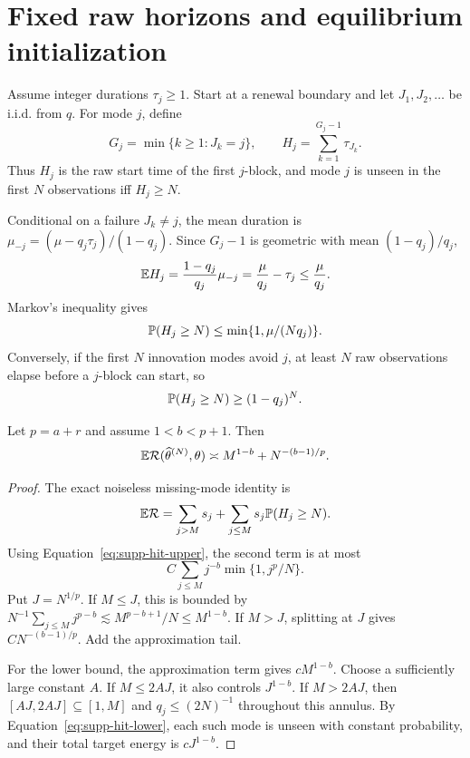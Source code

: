 \section{Fixed raw horizons and equilibrium initialization}

Assume integer durations $\tau_j\ge1$. Start at a renewal boundary and let
$J_1,J_2,\ldots$ be i.i.d. from $q$. For mode $j$, define
\[
G_j=\min\{k\ge1:J_k=j\},\qquad
H_j=\sum_{k=1}^{G_j-1}\tau_{J_k}.
\]
Thus $H_j$ is the raw start time of the first $j$-block, and mode $j$ is unseen
in the first $N$ observations iff $H_j\ge N$.

Conditional on a failure $J_k\ne j$, the mean duration is
$\mu_{-j}=(\mu-q_j\tau_j)/(1-q_j)$. Since $G_j-1$ is geometric with mean
$(1-q_j)/q_j$,
\[
\mathbb{E} H_j=\frac{1-q_j}{q_j}\mu_{-j}
=\frac{\mu}{q_j}-\tau_j\le\frac{\mu}{q_j}.
\]
Markov's inequality gives
\begin{equation}
\mathbb{P}(H_j\ge N)\le\min\{1,\mu/(Nq_j)\}.
\label{eq:supp-hit-upper}
\end{equation}
Conversely, if the first $N$ innovation modes avoid $j$, at least $N$ raw
observations elapse before a $j$-block can start, so
\begin{equation}
\mathbb{P}(H_j\ge N)\ge(1-q_j)^N.
\label{eq:supp-hit-lower}
\end{equation}

\begin{theorem}
Let $p=a+r$ and assume $1<b<p+1$. Then
\[
\mathbb{E}\mathcal{R}(\widehat\theta^{(N)},\theta)
\mathrel{\asymp} M^{1-b}+N^{-(b-1)/p}.
\]
\end{theorem}

\begin{proof}
The exact noiseless missing-mode identity is
\[
\mathbb{E}\mathcal{R}=\sum_{j>M}s_j+\sum_{j\le M}s_j\mathbb{P}(H_j\ge N).
\]
Using Equation~\eqref{eq:supp-hit-upper}, the second term is at most
\[
C\sum_{j\le M}j^{-b}\min\{1,j^p/N\}.
\]
Put $J=N^{1/p}$. If $M\le J$, this is bounded by
$N^{-1}\sum_{j\le M}j^{p-b}\lesssim M^{p-b+1}/N\le M^{1-b}$.
If $M>J$, splitting at $J$ gives $CN^{-(b-1)/p}$. Add the approximation tail.

For the lower bound, the approximation term gives $cM^{1-b}$. Choose a
sufficiently large constant $A$. If $M\le2AJ$, it also controls $J^{1-b}$.
If $M>2AJ$, then $[AJ,2AJ]\subseteq[1,M]$ and
$q_j\le(2N)^{-1}$ throughout this annulus. By
Equation~\eqref{eq:supp-hit-lower}, each such mode is unseen with constant
probability, and their total target energy is $cJ^{1-b}$.
\end{proof}

